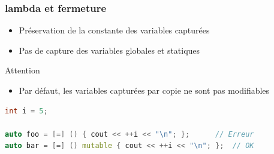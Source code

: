 \documentclass[C++.tex]{subfiles}
\begin{document}
\begin{frame}[fragile]
	\frametitle{lambda et fermeture}
	\begin{itemize}
		\item Préservation de la constante des variables capturées


		\item Pas de capture des variables globales et statiques

	\end{itemize}

	\begin{alertblock}{Attention}
		\begin{itemize}
			\item Par défaut, les variables capturées par copie ne sont pas modifiables
		\end{itemize}
	
		\begin{lstlisting}[language=C++]
int i = 5;
	
auto foo = [=] () { cout << ++i << "\n"; };      // Erreur
auto bar = [=] () mutable { cout << ++i << "\n"; };  // OK\end{lstlisting}
	
	\end{alertblock}
\end{frame}
\end{document}
